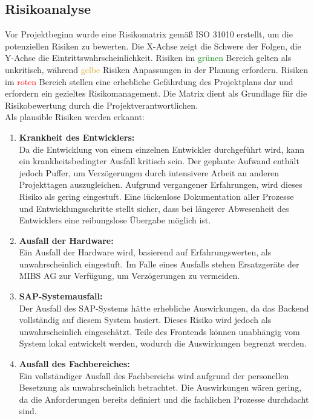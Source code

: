 \subsection{Risikoanalyse}
\label{sec:Risikoanalyse}
Vor Projektbeginn wurde eine Risikomatrix gemäß ISO 31010 erstellt, um die potenziellen Risiken zu bewerten. Die X-Achse zeigt die Schwere der Folgen, die Y-Achse die Eintrittswahrscheinlichkeit. Risiken im \textcolor{Green}{grünen} Bereich gelten als unkritisch, während \textcolor{Goldenrod}{gelbe} Risiken Anpassungen in der Planung erfordern. Risiken im \textcolor{red}{roten} Bereich stellen eine erhebliche Gefährdung des Projektplans dar und erfordern ein gezieltes Risikomanagement. Die Matrix dient als Grundlage für die Risikobewertung durch die Projektverantwortlichen.\\ 
\newpage
Als plausible Risiken werden erkannt:
\begin{enumerate}
\item \textbf{Krankheit des Entwicklers:\\}
Da die Entwicklung von einem einzelnen Entwickler durchgeführt wird, kann ein krankheitsbedingter Ausfall kritisch sein. Der geplante Aufwand enthält jedoch Puffer, um Verzögerungen durch intensivere Arbeit an anderen Projekttagen auszugleichen. Aufgrund vergangener Erfahrungen, wird dieses Risiko als gering eingestuft. Eine lückenlose Dokumentation aller Prozesse und Entwicklungsschritte stellt sicher, dass bei längerer Abwesenheit des Entwicklers eine reibungslose Übergabe möglich ist.
\item \textbf{Ausfall der Hardware:\\}
Ein Ausfall der Hardware wird, basierend auf Erfahrungswerten, als unwahrscheinlich eingestuft. Im Falle eines Ausfalls stehen Ersatzgeräte der MIBS AG zur Verfügung, um Verzögerungen zu vermeiden.
\item \textbf{SAP-Systemausfall:\\}
Der Ausfall des SAP-Systems hätte erhebliche Auswirkungen, da das Backend vollständig auf diesem System basiert. Dieses Risiko wird jedoch als unwahrscheinlich eingeschätzt. Teile des Frontends können unabhängig vom System lokal entwickelt werden, wodurch die Auswirkungen begrenzt werden.
\item \textbf{Ausfall des Fachbereiches:\\}
Ein vollständiger Ausfall des Fachbereichs wird aufgrund der personellen Besetzung als unwahrscheinlich betrachtet. Die Auswirkungen wären gering, da die Anforderungen bereits definiert und die fachlichen Prozesse durchdacht sind.
\end{enumerate}


